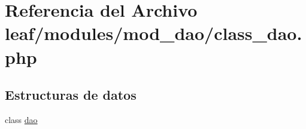 \hypertarget{class__dao_8php}{\section{Referencia del Archivo leaf/modules/mod\-\_\-dao/class\-\_\-dao.php}
\label{class__dao_8php}
}
\subsection*{Estructuras de datos}
\begin{DoxyCompactItemize}
\item 
class \hyperlink{classdao}{dao}
\end{DoxyCompactItemize}
